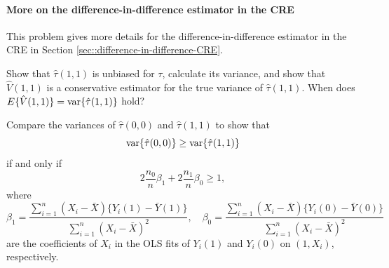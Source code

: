  
%
%
%
%
%
%


\paragraph{More on the difference-in-difference estimator in the CRE}\label{hw::did-CRE}

This problem gives more details for the difference-in-difference estimator in the CRE in Section \ref{sec::difference-in-difference-CRE}. 

Show that $\hat{\tau}(1,1) $ is unbiased for $\tau$, calculate its variance, and show that $\hat{V}( 1,1 ) $ is a conservative estimator for the true variance of $\hat{\tau}(1,1) $. When does $E\{\hat{V}( 1,1 ) \} = \textup{var}\{  \hat{\tau}(1,1)  \}$ hold?



Compare the variances of $\hat{\tau}(0,0) $ and $\hat{\tau}(1,1) $ to show that 
$$
\textup{var}\{ \hat{\tau}(0,0) \}  \geq \textup{var}\{  \hat{\tau}(1,1)  \}
$$
if and only if 
$$
2 \frac{n_0}{n} \beta_1 + 2\frac{n_1}{n} \beta_0 \geq 1,
$$
where 
$$
\beta_1 = \frac{\sum_{i=1}^n (X_i-\bar{X})\{  Y_i(1)-\bar{Y}(1) \}  }{  \sum_{i=1}^n (X_i-\bar{X})^2 },\quad
\beta_0 = \frac{\sum_{i=1}^n (X_i-\bar{X})\{  Y_i(0)-\bar{Y}(0) \}  }{  \sum_{i=1}^n (X_i-\bar{X})^2 }
$$
are the coefficients of $X_i$ in the OLS fits of $Y_i(1)$ and $Y_i(0)$ on $(1,X_i)$, respectively. 


